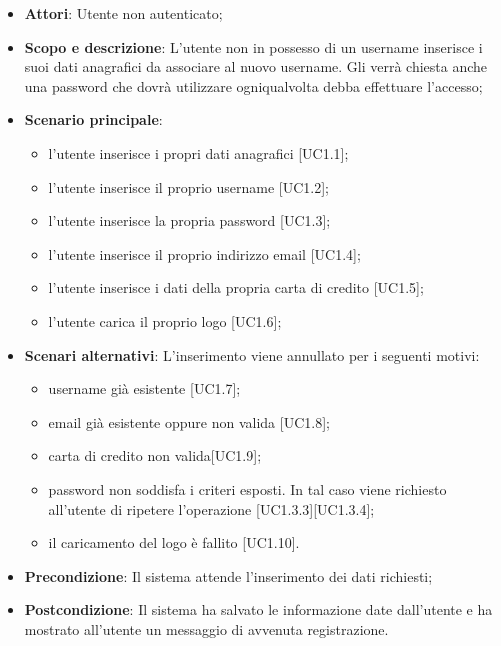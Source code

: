 \documentclass[12pt,a4paper,titlepage]{article}
\begin{document}
	\begin{itemize}
		\item \textbf{Attori}: Utente non autenticato;
		\item \textbf{Scopo e descrizione}: L'utente non in possesso di un username inserisce i suoi dati anagrafici da associare al nuovo username. Gli verrà chiesta anche una password che dovrà utilizzare ogniqualvolta debba effettuare l'accesso;
		\item \textbf{Scenario principale}: 
		\begin{itemize}
			\item l'utente inserisce i propri dati anagrafici [UC1.1];
			\item l'utente inserisce il proprio username [UC1.2];
			\item l'utente inserisce la propria password [UC1.3];
			\item l'utente inserisce il proprio indirizzo email [UC1.4];
			\item l'utente inserisce i dati della propria carta di credito [UC1.5];
			\item l'utente carica il proprio logo [UC1.6];
		\end{itemize}
		\item \textbf{Scenari alternativi}: L'inserimento viene annullato per i seguenti motivi:
		\begin{itemize}
			\item username già esistente [UC1.7];
			\item email già esistente oppure non valida [UC1.8];
			\item carta di credito non valida[UC1.9];
			\item password non soddisfa i criteri esposti. In tal caso viene richiesto all'utente di ripetere l'operazione [UC1.3.3][UC1.3.4];
			\item il caricamento del logo è fallito [UC1.10].
		\end{itemize}
		\item \textbf{Precondizione}: Il sistema attende l'inserimento dei dati richiesti;
		\item \textbf{Postcondizione}: Il sistema ha salvato le informazione date dall'utente e ha mostrato all'utente un messaggio di avvenuta registrazione.
	\end{itemize}
\end{document}
